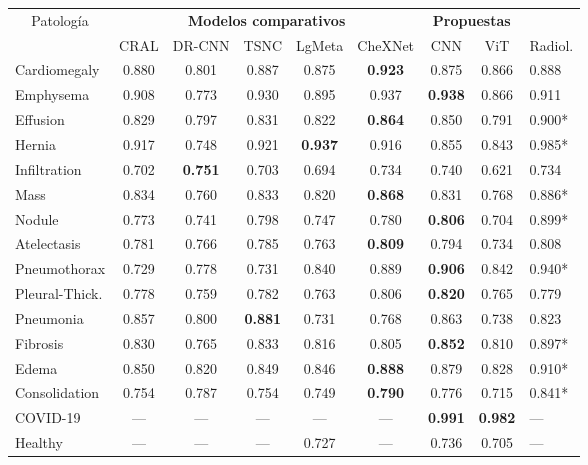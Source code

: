\begin{table}[tb]
    \centering
    \begin{tabular}{|l||c|c|c|c|c|c|c|l|}
        \hline
        \multicolumn{1}{|c||}{Patología}	&	\multicolumn{5}{c|}{\bf Modelos comparativos}    &\multicolumn{2}{c|}{\bf Propuestas} & 	\\
        \cline{2-9}
                        &	CRAL	&	DR-CNN	&	TSNC	& LgMeta & CheXNet	& CNN	    & ViT & 	Radiol.	\\
        \hline\hline
        Cardiomegaly	&	0.880	&	0.801	&	0.887	&	0.875	&\bf{0.923}	&	0.875	& 0.866 &	0.888	\\
        Emphysema	    &	0.908	&	0.773	&	0.930	&	0.895	&	0.937	&\bf{0.938}	& 0.866 &   0.911	\\
        Effusion	    &	0.829	&	0.797	&	0.831	&	0.822	&\bf{0.864}	&	0.850	& 0.791 &   0.900*	\\
        Hernia	        &	0.917	&	0.748	&	0.921	&\bf{0.937}	&	0.916	&	0.855	& 0.843 &   0.985*	\\
        Infiltration	&	0.702	&\bf{0.751}	&	0.703	&	0.694	&	0.734	&	0.740	& 0.621 &	0.734	\\
        Mass	        &	0.834	&	0.760	&	0.833	&	0.820	&\bf{0.868}	&	0.831	& 0.768 &	0.886*	\\
        Nodule	        &	0.773	&	0.741	&	0.798	&	0.747	&	0.780	&\bf{0.806}	& 0.704 &	0.899*	\\
        Atelectasis	    &	0.781	&	0.766	&	0.785	&	0.763	&\bf{0.809}	&	0.794	& 0.734 &	0.808	\\
        Pneumothorax	&	0.729	&	0.778	&	0.731	&	0.840	&	0.889	&\bf{0.906}	& 0.842 &	0.940*	\\
        Pleural-Thick.	&	0.778	&	0.759	&	0.782	&	0.763	&	0.806	&\bf{0.820}	& 0.765 &	0.779	\\
        Pneumonia	    &	0.857	&	0.800	&\bf{0.881}	&	0.731	&	0.768	&	0.863	& 0.738 &	0.823	\\
        Fibrosis	    &	0.830	&	0.765	&	0.833	&	0.816	&	0.805	&\bf{0.852}	& 0.810 &	0.897*	\\
        Edema	        &	0.850	&	0.820	&	0.849	&	0.846	&\bf{0.888}	&	0.879	& 0.828 &	0.910*	\\
        Consolidation	&	0.754	&	0.787	&	0.754	&	0.749	&\bf{0.790}	&	0.776	& 0.715 &	0.841*	\\
        \hline
        COVID-19	    &	---	    &	---	    &	---	    &	---	    &	---	    &\bf{0.991}	& \bf 0.982 &	---	    \\
        Healthy	        &	---	    &	---	    &	---	    &	0.727	&	---	    &	0.736	& 0.705 &	---	    \\

\end{tabular}
\end{table}

